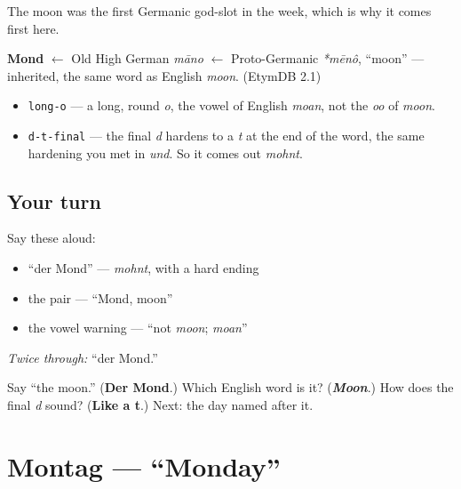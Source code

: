 The moon was the first Germanic god-slot in the week, which is why it comes first here.

\begin{cousinweb}
\textbf{Mond} $\leftarrow$ Old High German \emph{māno} $\leftarrow$ Proto-Germanic \emph{*mēnô}, \textquotedblleft{}moon\textquotedblright{} — inherited, the same word as English \emph{moon}. (EtymDB 2.1)
\end{cousinweb}

\begin{sounds}
\begin{itemize}
\raggedright
  \item \texttt{long-o} — a long, round \emph{o}, the vowel of English \emph{moan}, not the \emph{oo} of \emph{moon}.
  \item \texttt{d-t-final} — the final \emph{d} hardens to a \emph{t} at the end of the word, the same hardening you met in \emph{und}. So it comes out \emph{mohnt}.
\end{itemize}
\end{sounds}

\subsection*{Your turn}
Say these aloud:

\begin{itemize}
\raggedright
  \item \textquotedblleft{}der Mond\textquotedblright{} — \emph{mohnt}, with a hard ending
  \item the pair — \textquotedblleft{}Mond, moon\textquotedblright{}
  \item the vowel warning — \textquotedblleft{}not \emph{moon}; \emph{moan}\textquotedblright{}
\end{itemize}

\emph{Twice through:} \textquotedblleft{}der Mond.\textquotedblright{}

\begin{tcolorbox}[breakable,colback=teal!4,colframe=teal!35!black,title={Before you move on}]
Say \textquotedblleft{}the moon.\textquotedblright{} (\textbf{Der Mond}.) Which English word is it? (\emph{\textbf{Moon}}.) How does the final \emph{d} sound? (\textbf{Like a t}.) Next: the day named after it.
\end{tcolorbox}
\section[Montag]{Montag — \textquotedblleft{}Monday\textquotedblright{}}

